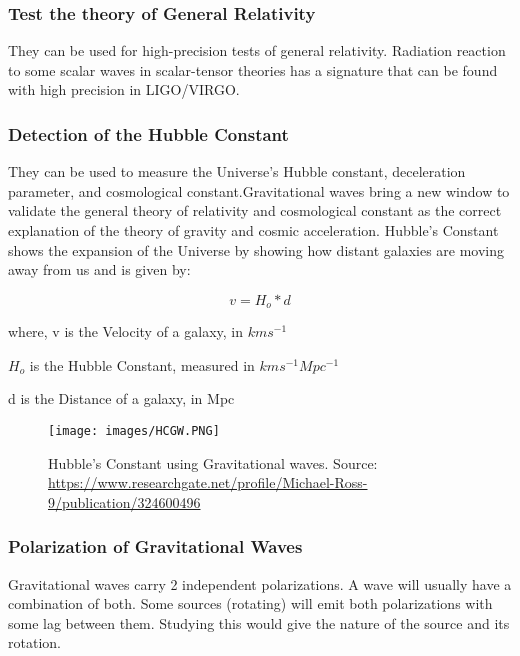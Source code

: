 \subsubsection{Test the theory of General Relativity}
\hspace{1cm}They can be used for high-precision tests of general relativity. Radiation reaction to some scalar waves in scalar-tensor theories has a signature that can be found with high precision in LIGO/VIRGO.

\subsubsection{Detection of the Hubble Constant}
\hspace{1cm}They can be used to measure the Universe’s Hubble constant, deceleration parameter, and cosmological constant.Gravitational waves bring a new window to validate the general theory of relativity and cosmological constant as the correct explanation of the theory of gravity and cosmic acceleration. Hubble's Constant shows the expansion of the Universe by showing how distant galaxies are moving away from us and is given by:
 
\begin{equation}
v = H_o*d
\end{equation}

where, v is the Velocity of a galaxy, in $kms^{-1}$

      $H_{o}$ is the Hubble Constant, measured in $kms^{-1}Mpc^{-1}$
      
      d is the Distance of a galaxy, in Mpc


\vspace{1cm}
\begin{figure}
    \centering
    \texttt{[image: images/HCGW.PNG]}
    \caption{Hubble's Constant using Gravitational waves. Source: \url{https://www.researchgate.net/profile/Michael-Ross-9/publication/324600496}}
\end{figure}
\subsubsection{Polarization of Gravitational Waves}
\hspace{1cm}Gravitational waves carry 2 independent polarizations. A wave will usually have a combination of both. Some sources (rotating) will emit both polarizations with some lag between them. Studying this would give the nature of the source and its rotation.


